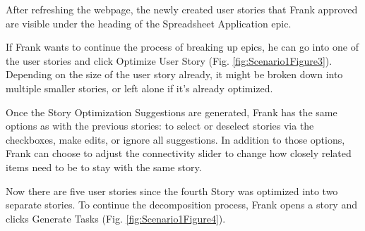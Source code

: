 After refreshing the webpage, the newly created user stories that Frank approved are visible under the heading of the Spreadsheet Application epic.

If Frank wants to continue the process of breaking up epics, he can go into one of the user stories and click Optimize User Story (Fig. \ref{fig:Scenario1Figure3}). Depending on the size of the user story already, it might be broken down into multiple smaller stories, or left alone if it’s already optimized.

Once the Story Optimization Suggestions are generated, Frank has the same options as with the previous stories: to select or deselect stories via the checkboxes, make edits, or ignore all suggestions. In addition to those options, Frank can choose to adjust the connectivity slider to change how closely related items need to be to stay with the same story.  

Now there are five user stories since the fourth Story was optimized into two separate stories. To continue the decomposition process, Frank opens a story and clicks Generate Tasks (Fig. \ref{fig:Scenario1Figure4}).

